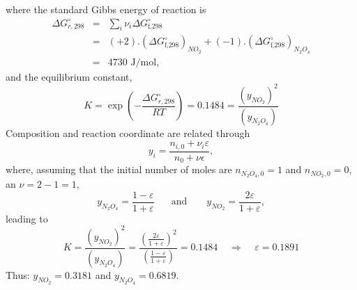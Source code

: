 \documentclass[calculator,allquestions,datasheet,mock,solutions]{exam_newMarcus2}
\newcommand{\frc}{\displaystyle\frac}
\begin{document}
\begin{question}
\begin{enumerate}[a)]
{\begin{enumerate}[A.]
\begin{displaymath}
                    \end{displaymath}
         where the standard Gibbs energy of reaction is~
         \begin{eqnarray}
           \Delta G^{\circ}_{r,298} &=& \sum\limits_{i}\nu_{i}\Delta G^{\circ}_{\text{f,298}} \nonumber \\
                             &=& (+2).\left(\Delta G^{\circ}_{\text{f,298}}\right)_{NO_{2}} + (-1).\left(\Delta G^{\circ}_{\text{f,298}}\right)_{N_{2}O_{4}} \nonumber \\ 
                             &=& 4730 \text{ J/mol}, \nonumber
         \end{eqnarray}
         and the equilibrium constant,~
         \begin{displaymath}
             K = \exp\left(-\frc{\Delta G^{\circ}_{r,298}}{RT}\right) = 0.1484 = \frac{\left(y_{NO_{2}}\right)^{2}}{\left(y_{N_{2}O_{4}}\right)}
         \end{displaymath}
         Composition and reaction coordinate are related through
         \begin{displaymath}
            y_{i} = \frc{n_{i,0} + \nu_{i}\varepsilon}{n_{0}+\nu\epsilon},
         \end{displaymath}
         where, assuming that the initial number of moles are $n_{N_{2}O_{4},0}=1$ and $n_{NO_{2},0}=0$, an $\nu= 2-1 = 1$,
         \begin{displaymath}
            y_{N_{2}O_{4}} = \frc{1-\varepsilon}{1+\varepsilon}\;\;\;\;\;\text{ and }\;\;\;\;\;\; y_{NO_{2}} = \frc{2\varepsilon}{1+\varepsilon},
         \end{displaymath}
         leading to
         \begin{displaymath}
             K = \frac{\left(y_{NO_{2}}\right)^{2}}{\left(y_{N_{2}O_{4}}\right)} = \frc{\left(\frc{2\varepsilon}{1+\varepsilon}\right)^{2}}{\left(\frc{1-\varepsilon}{1+\varepsilon}\right)} = 0.1484 \;\;\;\;\Longrightarrow\;\;\;\; \varepsilon = 0.1891
         \end{displaymath}
         Thus: $y_{NO_{2}} = 0.3181$ and $y_{N_{2}O_{4}} = 0.6819$.~


\end{enumerate}}
\end{enumerate}
\end{question}
\end{document}
